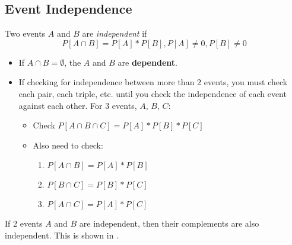 	\subsection{Event Independence} \label{subsec:Event Independence}
		\begin{definition}[Independent] \label{def:Event Independence}
			Two events $A$ and $B$ are \emph{independent} if 
			\begin{equation} \label{eq:Event Independence}
				P \left[ A \cap B \right] = P \left[ A \right] * P \left[ B \right], P\left[ A \right] \neq 0, P\left[ B \right] \neq 0
			\end{equation}
			\begin{itemize}[noitemsep, nolistsep]
				\item If $A \cap B = \emptyset$, the $A$ and $B$ are \textbf{dependent}.
				\item If checking for independence between more than 2 events, you must check each pair, each triple, etc. until you check the independence of each event against each other. For 3 events, $A$, $B$, $C$:
					\begin{itemize}[noitemsep, nolistsep]
						\item Check $P \left[ A \cap B \cap C \right] = P \left[ A \right] * P \left[ B \right] * P \left[ C \right]$
						\item Also need to check:
							\begin{enumerate}
								\item $P \left[ A \cap B \right] = P \left[ A \right] * P \left[ B \right]$
								\item $P \left[ B \cap C \right] = P \left[ B \right] * P \left[ C \right]$
								\item $P \left[ A \cap C \right] = P \left[ A \right] * P \left[ C \right]$
							\end{enumerate}
					\end{itemize}
			\end{itemize}
		\end{definition}
	If 2 events $A$ and $B$ are independent, then their complements are also independent. This is shown in .
